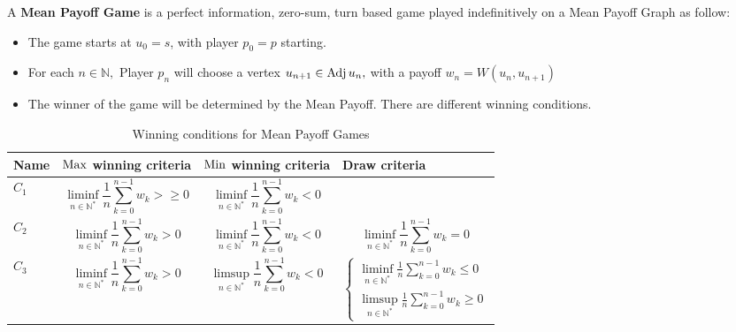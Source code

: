A  \textbf{Mean Payoff Game} is a perfect information, zero-sum, turn based game played indefinitively on a Mean Payoff Graph as follow:
\begin{itemize}
\item The game starts at $u_0=s$, with player $p_0=p$ starting.
\item For each $n\in\mathbb{N},$ Player $p_n$ will choose a vertex $u_{n+1}\in \operatorname{Adj} u_n,$ with a payoff $w_n=W(u_n,u_{n+1})$
\item The winner of the game will be determined by the Mean Payoff. There are different winning conditions.
\end{itemize}

\begin{table}[h]
	\small
	\begin{tabularx}{\textwidth}{| p{2cm} | X | X | X |}
		\hline
		
		Name & $\operatorname{Max}$ winning criteria & $\operatorname{Min}$ winning criteria & Draw criteria  \\
		\hline
		$C_1$ & \begin{equation*}
			\liminf_{n\in\mathbb{N}^*} \frac{1}{n}\sum_{k=0}^{n-1} w_k >\ge 0
		\end{equation*} & \begin{equation*}
		\liminf_{n\in\mathbb{N}^*} \frac{1}{n}\sum_{k=0}^{n-1} w_k < 0
		\end{equation*} & \cellcolor{gray!75} \\
		\hline
		$C_2$ & \begin{equation*}
			\liminf_{n\in\mathbb{N}^*} \frac{1}{n}\sum_{k=0}^{n-1} w_k > 0
		\end{equation*} & \begin{equation*}
			\liminf_{n\in\mathbb{N}^*} \frac{1}{n}\sum_{k=0}^{n-1} w_k < 0
		\end{equation*} & \begin{equation*}
		\liminf_{n\in\mathbb{N}^*} \frac{1}{n}\sum_{k=0}^{n-1} w_k = 0
		\end{equation*} \\
		\hline
		 $C_3$ & \begin{equation*}
		 	\liminf_{n\in\mathbb{N}^*} \frac{1}{n}\sum_{k=0}^{n-1} w_k > 0
		 \end{equation*} & \begin{equation*}
		 	\limsup_{n\in\mathbb{N}^*} \frac{1}{n}\sum_{k=0}^{n-1} w_k < 0
		 \end{equation*} & \begin{equation*}
		 \begin{cases} 
		 	\displaystyle \liminf_{n\in\mathbb{N}^*} \frac{1}{n}\sum_{k=0}^{n-1} w_k \le 0 \\
		 	 \displaystyle \limsup_{n\in\mathbb{N}^*} \frac{1}{n}\sum_{k=0}^{n-1} w_k \ge 0
		 \end{cases}
		 \end{equation*}\\
		\hline
	\end{tabularx}
	\caption{Winning conditions for Mean Payoff Games}
	\label{table:WinningConditions}
\end{table}
